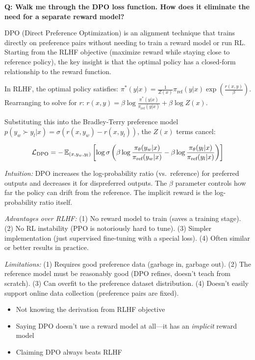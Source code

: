 \begin{interviewq}
\textbf{Q: Walk me through the DPO loss function. How does it eliminate the need for a separate reward model?}

 \quad {} \quad \badgefreq{\freqhigh}

\stronganswer DPO (Direct Preference Optimization) is an alignment technique that trains directly on preference pairs without needing to train a reward model or run RL. Starting from the RLHF objective (maximize reward while staying close to reference policy), the key insight is that the optimal policy has a closed-form relationship to the reward function.

In RLHF, the optimal policy satisfies: $\pi^*(y|x) = \frac{1}{Z(x)} \pi_{\text{ref}}(y|x) \exp\left(\frac{r(x,y)}{\beta}\right)$. Rearranging to solve for $r$: $r(x,y) = \beta \log \frac{\pi^*(y|x)}{\pi_{\text{ref}}(y|x)} + \beta \log Z(x)$.

Substituting this into the Bradley-Terry preference model $p(y_w \succ y_l | x) = \sigma(r(x,y_w) - r(x,y_l))$, the $Z(x)$ terms cancel:

$$\mathcal{L}_{\text{DPO}} = -\operatorname{\mathbb{E}}_{(x, y_w, y_l)}\left[\log \sigma\left(\beta \log \frac{\pi_\theta(y_w|x)}{\pi_{\text{ref}}(y_w|x)} - \beta \log \frac{\pi_\theta(y_l|x)}{\pi_{\text{ref}}(y_l|x)}\right)\right]$$

\textit{Intuition:} DPO increases the log-probability ratio (vs.\ reference) for preferred outputs and decreases it for dispreferred outputs. The $\beta$ parameter controls how far the policy can drift from the reference. The implicit reward is the log-probability ratio itself.

\textit{Advantages over RLHF:} (1) No reward model to train (saves a training stage). (2) No RL instability (PPO is notoriously hard to tune). (3) Simpler implementation (just supervised fine-tuning with a special loss). (4) Often similar or better results in practice.

\textit{Limitations:} (1) Requires good preference data (garbage in, garbage out). (2) The reference model must be reasonably good (DPO refines, doesn't teach from scratch). (3) Can overfit to the preference dataset distribution. (4) Doesn't easily support online data collection (preference pairs are fixed).

\redflags
\begin{itemize}
    \item Not knowing the derivation from RLHF objective
    \item Saying DPO doesn't use a reward model at all---it has an \textit{implicit} reward model
    \item Claiming DPO always beats RLHF
\end{itemize}


\end{interviewq}
